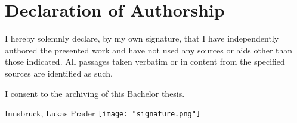\documentclass[12pt,a4paper]{article}
\begin{document}
\clearpage
\section*{Declaration of Authorship}

I hereby solemnly declare, by my own signature, that I have independently authored the presented work and have not used any sources or aids other than those indicated. All passages taken verbatim or in content from the specified sources are identified as such.

I consent to the archiving of this Bachelor thesis.

\hfill
\vspace{2cm} Innsbruck, \findate \hfill Lukas Prader \texttt{[image: "signature.png"]}


\newpage
\printbibliography[]

\end{document}
